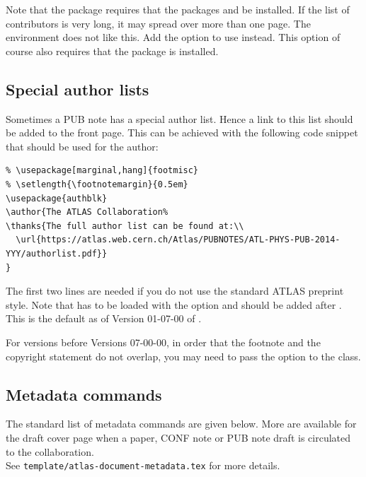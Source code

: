 Note that the  package requires that the packages 
 and  be installed.
If the list of contributors is very long, it may spread over more than one page.
The  environment does not like this.
Add the option  to use  instead.
This option of course also requires that the package  is installed.


\subsection{Special author lists}

Sometimes a PUB note has a special author list.
Hence a link to this list should be added to the front page.
This can be achieved with the following code snippet that should be used for the author:
\begin{verbatim}
% \usepackage[marginal,hang]{footmisc}
% \setlength{\footnotemargin}{0.5em}
\usepackage{authblk}
\author{The ATLAS Collaboration%
\thanks{The full author list can be found at:\\
  \url{https://atlas.web.cern.ch/Atlas/PUBNOTES/ATL-PHYS-PUB-2014-YYY/authorlist.pdf}}
}
\end{verbatim}

The first two lines are needed if you do not use the standard ATLAS preprint style.
Note that  has to be loaded with the option 
and  should be added after \verb||.
This is the default as of Version 01-07-00 of .

For versions before Versions 07-00-00,
in order that the footnote and the copyright statement do not overlap,
you may need to pass the option  to the  class.


\subsection{Metadata commands}

The standard list of metadata commands are given below.
More are available for the draft cover page when a paper, CONF note or PUB note draft
is circulated to the collaboration.\\
See \texttt{template/atlas-document-metadata.tex} for more details.

